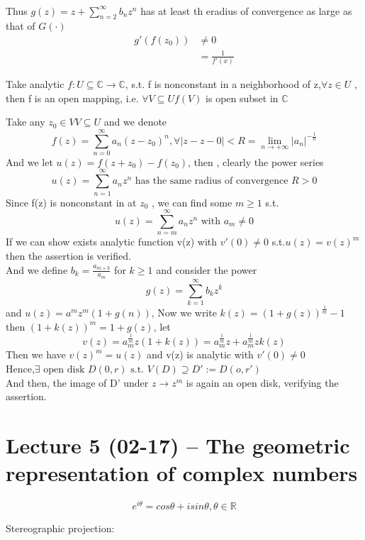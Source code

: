 \\Thus $g(z)=z+ \sum_{n=2}^{\infty}b_nz^n $ has at least th eradius of convergence as large as that of $ G(\cdot) $ 
\begin{align*}{}{}
g'(f(z_0))&\neq0\\
&=\frac{1}{f'(x)}
\end{align*}
\begin{definition}{}
Take analytic $ f:U\subseteq \mathbb{C}\rightarrow\mathbb{C} $, s.t. f is nonconstant in a neighborhood of z,$ \forall z \in U  $  , then f is an open mapping, i.e. $ \forall V\subseteq Uf(V) $ is open subset in $ \mathbb{C} $
\end{definition}
Take any $ z_0\in V V\subseteq U$ and we denote$$
    f(z)=\sum_{n=0}^{\infty}a_n{(z-z_0)}^n,\forall |z-z-0|<R=\lim_{n\rightarrow+\infty}|a_n|^{-\frac{1}{n}}
$$ 
And we let $u(z)=f(z+z_0)-f(z_0)$, then , clearly the power series $$
    u(z)=\sum_{n=1}^{\infty}a_n{z}^n \text{ has the same radius of convergence } R>0
$$ 
Since f(z) is nonconstant in at $ z_0 $ , we can find some $ m\geq1 $ s.t.$$
    u(z)=\sum_{n=m}^{\infty}a_n{z}^n \text{ with } a_m\neq 0
$$ 
If we can show exists analytic function v(z) with $v'(0)\neq0   $ s.t.$ u(z)=v(z)^m $ then the assertion is verified.
\\And we define $ b_k=\frac{a_{m+k}}{a_m} $ for $ k\geq1 $ and consider the power$$
    g(z)=\sum_{k=1}^{\infty}b_k{z}^k
$$ 
and $u(z)=a^mz^m(1+g(n))$, Now we write $ k(z)=(1+g(z))^\frac{1}{m} -1$ 
\\then $(1+k(z))^m=1+g(z)$, let$$
    v(z)=a_m^{\frac{1}{m}}z(1+k(z))=a_m^{\frac{1}{m}}z+a_m^{\frac{1}{m}}zk(z)
$$ 
Then we have $v(z)^m=u(z)$ and v(z) is analytic with $v'(0)\neq0$
\\Hence,$ \exists \text{ open disk } D(0,r) \text{ s.t. } V(D)\supseteq D':=D(o,r')$ 
\\And then, the image of D' under $ z\rightarrow z^m $ is again an open disk, verifying the assertion.  
\section{Lecture 5 (02-17) -- {The geometric representation of complex numbers}}
\begin{definition}{}
$$
    e^{i\theta}=cos\theta+isin\theta,\theta\in\mathbb{R}
$$
\end{definition}
Stereographic projection:
